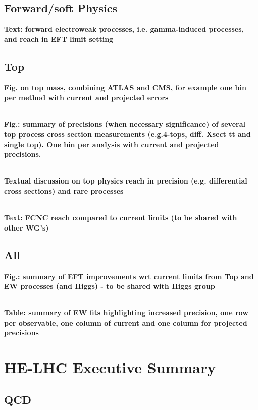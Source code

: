 \documentclass{article}
\begin{document}
\subsection{Forward/soft Physics}

{\bf Text: forward electroweak processes, i.e. gamma-induced processes, and reach in EFT limit setting}

\subsection{Top}


{\bf Fig. on top mass, combining ATLAS and CMS, for example one bin per method with current and projected errors}


\\
{\bf Fig.: summary of precisions (when necessary significance) of several top process cross section measurements (e.g.4-tops, diff. Xsect tt and single top). One bin per analysis with current and projected precisions.}


\\
{\bf Textual discussion on top physics reach in precision (e.g. differential cross sections) and rare processes}


\\
{\bf Text: FCNC reach compared to current limits (to be shared with other WG's)}

\subsection{All}


{\bf Fig.: summary of EFT improvements wrt current limits from Top and EW processes (and Higgs) - to be shared with Higgs group}


\\
{\bf Table: summary of EW fits highlighting increased precision, one row per observable, one column of current and one column for projected precisions}



\clearpage
\section{HE-LHC Executive Summary}

\subsection{QCD}
\end{document}
